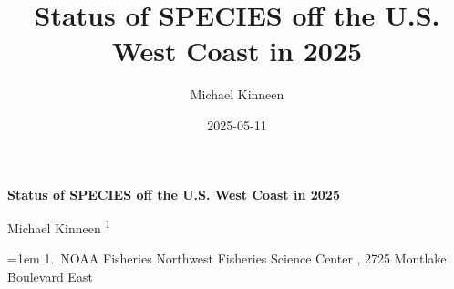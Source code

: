 \documentclass[
]{scrartcl}
\title{Status of SPECIES off the U.S. West Coast in 2025}
\author{Michael Kinneen}
\date{2025-05-11}
\begin{document}
  \begin{titlepage}

  \begin{minipage}[b][\textheight][s]{\textwidth}


  \raggedright




  {\huge\bfseries\nohyphens{Status of SPECIES off the U.S. West Coast in
  2025}}\\[1\baselineskip]



  \vspace{1\baselineskip}


  \vspace{1\baselineskip}

  {\large{Michael Kinneen}}%
  {\textsuperscript{1}}%



  \vspace{2\baselineskip}

  \hangindent=1em
  {1}.~{NOAA Fisheries Northwest Fisheries Science Center}%
  , %
  {2725 Montlake Boulevard East}%


  \vspace{1\baselineskip}



\end{minipage}
\end{titlepage}
\end{document}
